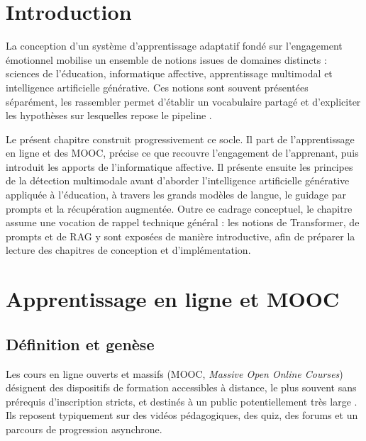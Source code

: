 
\section{Introduction}
\label{sec:fond-intro}

La conception d'un système d'apprentissage adaptatif fondé sur
l'engagement émotionnel mobilise un ensemble de notions issues de
domaines distincts : sciences de l'éducation, informatique affective,
apprentissage multimodal et intelligence artificielle générative. Ces
notions sont souvent présentées séparément, les rassembler permet
d'établir un vocabulaire partagé et d'expliciter les hypothèses sur
lesquelles repose le pipeline \emolearn{}.

Le présent chapitre construit progressivement ce socle. Il part de
l'apprentissage en ligne et des MOOC, précise ce que recouvre
l'engagement de l'apprenant, puis introduit les apports de l'informatique
affective. Il présente ensuite les principes de la détection multimodale
avant d'aborder l'intelligence artificielle générative appliquée à
l'éducation, à travers les grands modèles de langue, le guidage par
prompts et la récupération augmentée. Outre ce cadrage conceptuel, le
chapitre assume une vocation de rappel technique général : les notions
de Transformer, de prompts et de RAG y sont exposées de manière
introductive, afin de préparer la lecture des chapitres de conception et
d'implémentation.

\section{Apprentissage en ligne et MOOC}
\label{sec:fond-mooc}

\subsection{Définition et genèse}

Les cours en ligne ouverts et massifs (MOOC, \emph{Massive Open Online
Courses}) désignent des dispositifs de formation accessibles à distance, le
plus souvent sans prérequis d'inscription stricts, et destinés à un public
potentiellement très large \cite{daniel2012making}. Ils reposent
typiquement sur des vidéos pédagogiques, des quiz, des forums et un
parcours de progression asynchrone.

